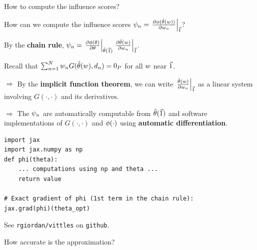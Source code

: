 \begin{frame}[fragile]{How to compute the influence scores?}

How can we compute the influence scores
%
%
$
\infl_n =
\fracat{\partial \thetafun(\thetahat(\w))}
       {\partial\w_n}{\onevec}
%
$?
%

\vspace{1em}
By the \textbf{chain rule},
$
\infl_n =
\fracat{\partial \thetafun(\theta)}
      {\partial\theta}{\thetahat(\onevec)}
\fracat{\partial \thetahat(\w)}
    {\partial\w_n}{\onevec}
%
$.

\vspace{1em}
Recall that
$\sum_{n=1}^N w_n G(\hat{\theta}(w), d_{n}) =  0_{P}$ for all $w$ near $\vec{1}$.


\vspace{1em}
$\Rightarrow$
By the \textbf{implicit function theorem}, we can write
$\left.\frac{\hat{\theta}(w)}{\partial w_n}\right|_{\vec{1}}$ as a linear system
involving $G(\cdot, \cdot)$ and its derivatives.

\vspace{1em}
$\Rightarrow$
The $\psi_n$ are automatically computable from $\hat{\theta}(\vec{1})$ and
software implementations of $G(\cdot, \cdot)$ and $\phi(\cdot)$
using \textbf{automatic differentiation}.



\begin{lstlisting}
import jax
import jax.numpy as np
def phi(theta):
    ... computations using np and theta ...
    return value

# Exact gradient of phi (1st term in the chain rule):
jax.grad(phi)(theta_opt)
\end{lstlisting}

See \texttt{rgiordan/vittles} on \texttt{github}.

\end{frame}



\begin{frame}{How accurate is the approximation?}






\end{frame}



